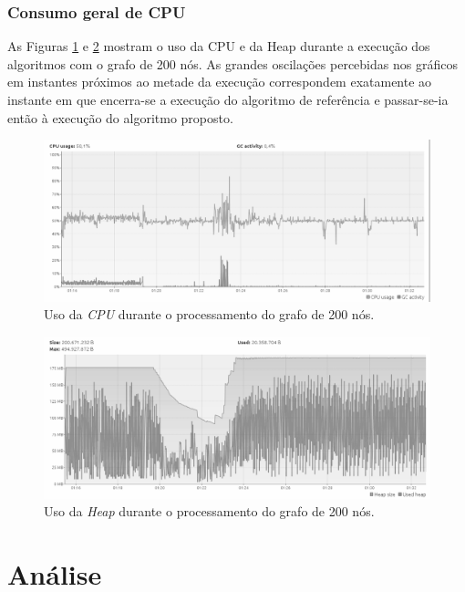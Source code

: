 \documentclass{acm_proc_article-sp}
\begin{document}
\subsubsection{Consumo geral de CPU}
As Figuras  \ref{cpu-usage} e \ref{heap-usage} mostram o uso da CPU e da Heap durante a execução dos algoritmos com
o grafo de 200 nós. As grandes oscilações percebidas nos gráficos em instantes próximos ao metade da execução
correspondem exatamente ao instante em que encerra-se a execução do algoritmo de referência e passar-se-ia então à
execução do algoritmo proposto.

\begin{figure}[ht]%
\centering
\includegraphics[scale=.2]{img/CPU_usage-200_1000.png}
\caption{Uso da \textit{CPU} durante o processamento do grafo de 200 nós.}
\label{cpu-usage}
\end{figure}

\begin{figure}[ht]%
\centering
\includegraphics[scale=.2]{img/MemoryHeap_Usage-200_1000.png}
\caption{Uso da \textit{Heap} durante o processamento do grafo de 200 nós.}
\label{heap-usage}
\end{figure}

\section{Análise}
\end{document}

